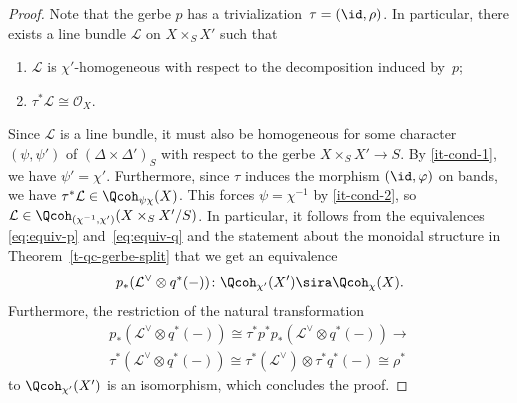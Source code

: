 \begin{proof}
Note that the gerbe $p$ has a trivialization~$\tau = (\id, \rho)$.
In particular, there exists a line bundle $\mathcal{L}$ on $X\times_S X'$ such
that
\begin{enumerate}
\item
\label{it-cond-1}
$\mathcal{L}$ is $\chi'$-homogeneous with respect to the decomposition induced by~$p$;
\item
\label{it-cond-2}
$\tau^*\mathcal{L} \cong \mathcal{O}_X$.
\end{enumerate}
Since $\mathcal{L}$ is a line bundle,
it must also be homogeneous for some character $(\psi, \psi')$ of $(\Delta\times\Delta')_S$
with respect to the gerbe $X\times_S X' \to S$.
By \ref{it-cond-1}, we have $\psi' = \chi'$.
Furthermore, since $\tau$ induces the morphism $(\id, \varphi)$ on bands,
we have $\tau^*\mathcal{L} \in \Qcoh_{\psi\chi}(X)$.
This forces $\psi = \chi^{-1}$ by \ref{it-cond-2},
so $\mathcal{L} \in \Qcoh_{(\chi^{-1}, \chi')}(X\times_S X'/S)$.
In particular, it follows from the equivalences \eqref{eq:equiv-p} and~\eqref{eq:equiv-q} and the statement about
the monoidal structure in Theorem~\ref{t-qc-gerbe-split} that we
get an equivalence
$$
p_*(\mathcal{L}^\vee\otimes q^*(-))\colon \Qcoh_{\chi'}(X') \sira \Qcoh_{\chi}(X).
$$
Furthermore, the restriction of the natural transformation 
\begin{multline*}
p_*(\mathcal{L}^\vee\otimes q^*(-)) \cong \tau^*p^*p_*(\mathcal{L}^\vee\otimes q^*(-)) \to\\
\tau^*(\mathcal{L}^\vee\otimes q^*(-)) \cong \tau^*(\mathcal{L}^\vee)\otimes \tau^*q^*(-) \cong \rho^*
\end{multline*}
to $\Qcoh_{\chi'}(X')$ is an isomorphism,
which concludes the proof.
\end{proof}

